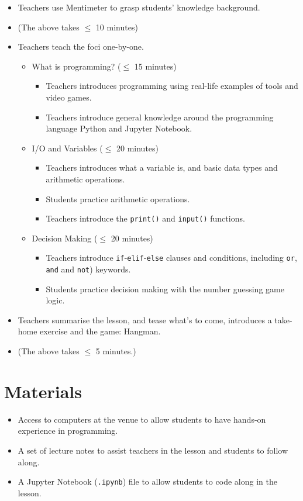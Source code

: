 \documentclass{article}
\def\T{Teachers }
\def\t{teachers }
\def\S{Students }
\def\s{students }
\begin{document}
\begin{itemize}
\item \T use Mentimeter to grasp students' knowledge background.

\item[] (The above takes $\leq$ 10 minutes)

\item \T teach the foci one-by-one.
	\begin{itemize}
		\item What is programming? ($\leq$ 15 minutes)
		\begin{itemize}
			\item \T introduces programming using real-life examples of tools and video games.
			\item \T introduce general knowledge around the programming language Python and Jupyter Notebook.
		\end{itemize}
		\item I/O and Variables ($\leq$ 20 minutes)
		\begin{itemize}
			\item \T introduces what a variable is, and basic data types and arithmetic operations.
			\item \S practice arithmetic operations.
			\item \T introduce the \texttt{print()} and \texttt{input()} functions.
		\end{itemize}
		\item Decision Making ($\leq$ 20 minutes)
		\begin{itemize}
			\item \T introduce \texttt{if}-\texttt{elif}-\texttt{else} clauses and conditions, including \texttt{or}, \texttt{and} and \texttt{not}) keywords.
			\item \S practice decision making with the number guessing game logic.
		\end{itemize}
	\end{itemize}

\item \T summarise the lesson, and tease what's to come, introduces a take-home exercise and the game: Hangman.

\item[] (The above takes $\leq$ 5 minutes.)
\end{itemize} 

\section*{Materials}

\begin{itemize}
\item Access to computers at the venue to allow \s to have hands-on experience in programming.
\item A set of lecture notes to assist \t in the lesson and \s to follow along.
\item A Jupyter Notebook (\texttt{.ipynb}) file to allow \s to code along in the lesson.
\end{itemize}
\end{document}
